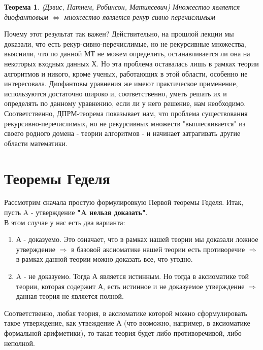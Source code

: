 \documentclass[a4paper]{article}
\newtheorem{theorem} {Теорема}
\begin{document}
{\begin{theorem}(Дэвис, Патнем, Робинсон, Матиясевич)
Множество является диофантовым $\Leftrightarrow$ множество является рекур-сивно-перечислимым
\end{theorem}
Почему этот результат так важен?
\newline Действительно, на прошлой лекции мы доказали, что есть рекур-сивно-перечислимые, но не рекурсивные множества, выяснили, что по данной МТ не можем определить, останавливается ли она на некоторых входных данных Х. Но эта проблема оставалась лишь в рамках теории алгоритмов и никого, кроме ученых, работающих в этой области, особенно не интересовала. Диофантовы уравнения же имеют практическое применение, используются достаточно широко и, соответственно, уметь решать их и определять по данному уравнению, если ли у него решение, нам необходимо. Соответственно, ДПРМ-теорема показывает нам, что проблема существования рекурсивно-перечислимых, но не рекурсивных множеств "выплескивается" из своего родного домена - теории алгоритмов - и начинает затрагивать другие области математики. 

\section{Теоремы Геделя}
Рассмотрим сначала простую формулировкую Первой теоремы Геделя. 
Итак, пусть A - утверждение
\textbf{"A нельзя доказать"}.
\\
В этом случае у нас есть два варианта:
\begin{enumerate}
\item А - доказуемо. Это означает, что в рамках нашей теории мы доказали ложное утверждение $\Rightarrow$ в базовой аксиоматике нашей теории есть противоречие $\Rightarrow$ в рамках данной теории можно доказать все, что угодно.
\item A - не доказуемо. Тогда А является истинным. Но тогда в аксиоматике той теории, которая содержит А, есть истинное и не доказуемое утверждение $\Rightarrow$ данная теория не является полной.
\end{enumerate}

Соответственно, любая теория, в аксиоматике которой можно сформулировать такое утверждение, как утвеждение А (что возможно, например, в аксиоматике формальной арифметики), то такая теория будет либо противоречивой, либо неполной.

}
\end{document}
